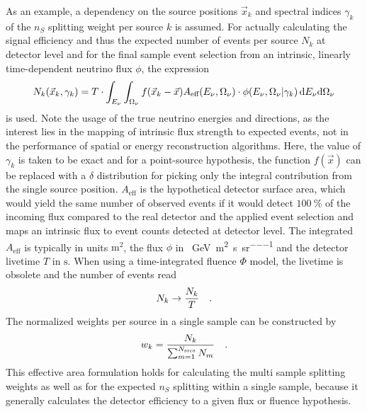 As an example, a dependency on the source positions $\vec{x}_k$ and spectral indices $\gamma_k$ of the $n_S$ splitting weight per source $k$ is assumed.
For actually calculating the signal efficiency and thus the expected number of events per source $N_k$ at detector level and for the final sample event selection from an intrinsic, linearly time-dependent neutrino flux $\phi$, the expression
\begin{equation}
  \label{equ:eff_area_analytic}
  N_k(\vec{x}_k, \gamma_k)
  = T \cdot \int_{E_\nu} \int_{\Omega_\nu} f(\vec{x}_k - \vec{x})
      A_\text{eff}(E_\nu,\Omega_\nu) \cdot
      \phi(E_\nu,\Omega_\nu | \gamma_k) \,\mathrm{d}E_\nu\mathrm{d}\Omega_\nu
\end{equation}
is used.
Note the usage of the true neutrino energies and directions, as the interest lies in the mapping of intrinsic flux strength to expected events, not in the performance of spatial or energy reconstruction algorithms.
Here, the value of $\gamma_k$ is taken to be exact and for a point-source hypothesis, the function $f(\vec{x})$ can be replaced with a $\delta$ distribution for picking only the integral contribution from the single source position.
$A_\text{eff}$ is the hypothetical detector surface area, which would yield the same number of observed events if it would detect $\SI{100}{\percent}$ of the incoming flux compared to the real detector and the applied event selection and maps an intrinsic flux to event counts detected at detector level.
The integrated $A_\text{eff}$ is typically in units $\si{\m\squared}$, the flux $\phi$ in \si{\per\GeV\per\m\squared\per\second\per\steradian} and the detector livetime $T$ in $\si{\second}$.
When using a time-integrated fluence $\Phi$ model, the livetime is obsolete and the number of events read
\begin{equation}
  N_k \rightarrow \frac{N_k}{T}
  \quad\text{.}
\end{equation}
The normalized weights per source in a single sample can be constructed by
\begin{equation}
  \label{equ:general_satcking_weights}
  w_k = \frac{N_k}{\sum_{m=1}^{N_\text{srcs}} N_m}
  \quad\text{.}
\end{equation}
This effective area formulation holds for calculating the multi sample splitting weights as well as for the expected $n_S$ splitting within a single sample, because it generally calculates the detector efficiency to a given flux or fluence hypothesis.

